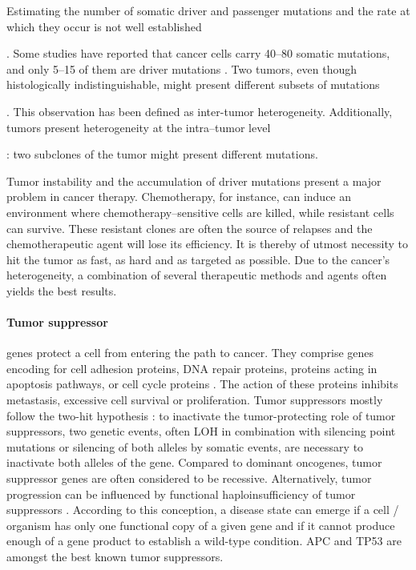     Estimating the number of somatic driver and passenger mutations and the rate
    at which they occur is not well established {\cite{driver_passenger}. Some
    studies have reported that cancer cells carry 40--80 somatic mutations, and
    only 5--15 of them are driver mutations {\cite{som_mut}}. Two tumors, even
    though histologically indistinguishable, might present different subsets of
    mutations {\cite{driver_passenger} {\cite{intertumor}}. This observation has
    been defined as inter-tumor heterogeneity. Additionally, tumors present
    heterogeneity at the intra--tumor level {\cite{intratumor}: two subclones of
    the tumor might present different mutations.

    Tumor instability and the accumulation of driver mutations present a major problem
    in cancer therapy. Chemotherapy, for instance, can induce an environment where
    chemotherapy--sensitive cells are killed, while resistant cells can survive.
    These resistant clones are often the source of relapses and the
    chemotherapeutic agent will lose its efficiency. It is thereby of utmost
    necessity to hit the tumor as fast, as hard and as targeted as possible. Due to the
    cancer's heterogeneity, a combination of several therapeutic methods and
    agents often yields the best results.

    \paragraph{Tumor suppressor} genes protect a cell from entering the path to
    cancer. They comprise genes encoding for cell adhesion proteins, DNA repair
    proteins, proteins acting in apoptosis pathways, or cell cycle proteins
    {\cite{tumor_supp}}. The action of these proteins inhibits metastasis,
    excessive cell survival or proliferation. Tumor suppressors mostly follow
    the two-hit hypothesis {\cite{two_hit}}: to inactivate the tumor-protecting
    role of tumor suppressors, two genetic events, often LOH in combination
    with silencing point mutations or silencing of both alleles by somatic
    events, are necessary to inactivate both alleles of the gene. Compared to
    dominant oncogenes, tumor suppressor genes are often considered to be
    recessive. Alternatively, tumor progression can be influenced by functional
    haploinsufficiency of tumor suppressors {\cite{haploinsuff}}. According to
    this conception, a disease state can emerge if a cell / organism has only
    one functional copy of a given gene and if it cannot produce enough of a
    gene product to establish a wild-type condition. APC and TP53 are amongst
    the best known tumor suppressors.

}}}
